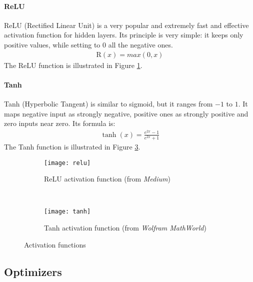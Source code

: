 \paragraph{ReLU} ReLU (Rectified Linear Unit) is a very popular and extremely fast and effective activation function for hidden layers. Its principle is very simple: it keeps only positive values, while setting to 0 all the negative ones.
\begin{align}
    \text{R}(x) = max(0, x)
\end{align}
The ReLU function is illustrated in Figure \ref{fig:relu}.

\paragraph{Tanh} Tanh (Hyperbolic Tangent) is similar to sigmoid, but it ranges from $-1$ to $1$. It maps negative input as strongly negative, positive ones as strongly positive and zero inputs near zero. Its formula is:
\begin{align}
    \tanh{(x)} = \frac{e^{2x} - 1}{e^{2x} + 1}
\end{align}
The Tanh function is illustrated in Figure \ref{fig:tanh}.
\begin{figure}[htbp]
    \centering
    \begin{subfigure}[t]{0.5\textwidth}
		\texttt{[image: relu]}
        \caption{ReLU activation function (from \textit{Medium})}
        \label{fig:relu}
	\end{subfigure}%
	~
	\begin{subfigure}[t]{0.5\textwidth}
		\texttt{[image: tanh]}
        \caption{Tanh activation function (from \textit{Wolfram MathWorld})}
        \label{fig:tanh}
	\end{subfigure}
	\caption{Activation functions}
\end{figure}


\subsection{Optimizers}
